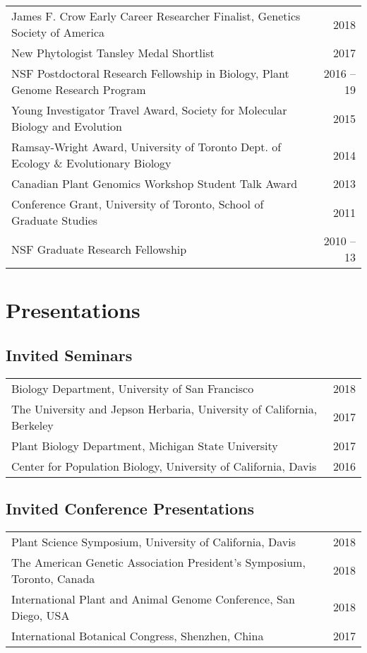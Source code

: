 \documentclass[letterpaper]{article}
\begin{document}
\begin{tabular}{MN}
James F. Crow Early Career Researcher Finalist, Genetics Society of America & 2018 \\
New Phytologist Tansley Medal Shortlist & 2017 \\
NSF Postdoctoral Research Fellowship in Biology, Plant Genome Research Program & 2016 -- 19\\
Young Investigator Travel Award, Society for Molecular Biology and Evolution &  2015\\
Ramsay-Wright Award, University of Toronto Dept. of Ecology \& Evolutionary Biology & 2014\\
Canadian Plant Genomics Workshop Student Talk Award & 2013 \\
Conference Grant, University of Toronto, School of Graduate Studies  & 2011\\
NSF Graduate Research Fellowship&2010 -- 13
\end{tabular}
\section*{Presentations}
\subsection*{Invited Seminars}
\begin{tabular}{MN}
Biology Department, University of San Francisco & 2018\\
The University and Jepson Herbaria, University of California, Berkeley & 2017 \\
Plant Biology Department, Michigan State University & 2017 \\
Center for Population Biology, University of California, Davis & 2016 \\
\end{tabular}

\subsection*{Invited Conference Presentations}
\begin{tabular}{MN}
Plant Science Symposium, University of California, Davis & 2018 \\
The American Genetic Association President's Symposium, Toronto, Canada & 2018\\
International Plant and Animal Genome Conference, San Diego, USA & 2018\\
International Botanical Congress, Shenzhen, China & 2017
\end{tabular}
\end{document}
